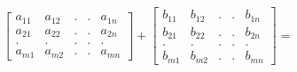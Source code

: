 \documentclass[preview]{standalone}
\begin{document}
\begin{align*}
\begin{bmatrix} {a}_{11} & {a}_{12} & . & . & {a}_{1n} \\ {a}_{21} & {a}_{22} & . & . & {a}_{2n} \\ . & . & . & . & . \\ {a}_{m1} & {a}_{m2} & . & . & {a}_{mn}\end{bmatrix} + \begin{bmatrix} {b}_{11} & {b}_{12} & . & . & {b}_{1n} \\ {b}_{21} & {b}_{22} & . & . & {b}_{2n} \\ . & . & . & . & . \\ {b}_{m1} & {b}_{m2} & . & . & {b}_{mn}\end{bmatrix} =
\end{align*}
\end{document}
